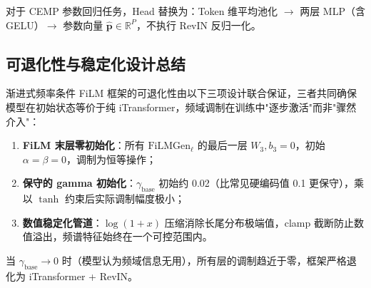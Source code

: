 对于 CEMP 参数回归任务，Head 替换为：Token 维平均池化 \(\to\) 两层 MLP（含 GELU）\(\to\) 参数向量 \(\hat{\bm{p}} \in \mathbb{R}^{P}\)，不执行 RevIN 反归一化。

\subsection{可退化性与稳定化设计总结}
\label{subsec:stability}

渐进式频率条件 FiLM 框架的可退化性由以下三项设计联合保证，三者共同确保模型在初始状态等价于纯 iTransformer，频域调制在训练中"逐步激活"而非"骤然介入"：

\begin{enumerate}[leftmargin=*,itemsep=2pt]
  \item \textbf{FiLM 末层零初始化}：所有 \(\mathrm{FiLMGen}_{\ell}\) 的最后一层 \(W_3, b_3 = 0\)，初始 \(\alpha = \beta = 0\)，调制为恒等操作；
  \item \textbf{保守的 gamma 初始化}：\(\gamma_{\text{base}}\) 初始约 0.02（比常见硬编码值 0.1 更保守），乘以 \(\tanh\) 约束后实际调制幅度极小；
  \item \textbf{数值稳定化管道}：\(\log(1+x)\) 压缩消除长尾分布极端值，clamp 截断防止数值溢出，频谱特征始终在一个可控范围内。
\end{enumerate}

当 \(\gamma_{\text{base}} \to 0\) 时（模型认为频域信息无用），所有层的调制趋近于零，框架严格退化为 iTransformer + RevIN。
